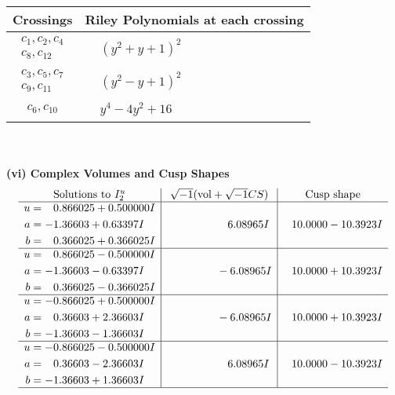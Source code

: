 \documentclass[1p]{elsarticle_modified}
\theoremstyle{definition}
\newcommand{\I}{\sqrt{-1}}
\begin{document}
\begin{tabular}{m{50pt}|m{274pt}}
Crossings & \hspace{64pt}Riley Polynomials at each crossing \\
\hline $$\begin{aligned}c_{1},c_{2},c_{4}\\c_{8},c_{12}\end{aligned}$$&$\begin{aligned}
&(y^2+y+1)^2
\end{aligned}$\\
\hline $$\begin{aligned}c_{3},c_{5},c_{7}\\c_{9},c_{11}\end{aligned}$$&$\begin{aligned}
&(y^2- y+1)^2
\end{aligned}$\\
\hline $$\begin{aligned}c_{6},c_{10}\end{aligned}$$&$\begin{aligned}
&y^4-4 y^2+16
\end{aligned}$\\
\hline
\end{tabular}\\~\\
\newpage\flushleft \textbf{(vi) Complex Volumes and Cusp Shapes}
$$\begin{array}{c|c|c}  
\text{Solutions to }I^u_{2}& \I (\text{vol} + \sqrt{-1}CS) & \text{Cusp shape}\\
 \hline 
\begin{aligned}
u &= \phantom{-}0.866025 + 0.500000 I \\
a &= -1.36603 + 0.63397 I \\
b &= \phantom{-}0.366025 + 0.366025 I\end{aligned}
 & \phantom{-0.000000 -}6.08965 I & \phantom{-}10.0000 - 10.3923 I \\ \hline\begin{aligned}
u &= \phantom{-}0.866025 - 0.500000 I \\
a &= -1.36603 - 0.63397 I \\
b &= \phantom{-}0.366025 - 0.366025 I\end{aligned}
 & \phantom{-0.000000 } -6.08965 I & \phantom{-}10.0000 + 10.3923 I \\ \hline\begin{aligned}
u &= -0.866025 + 0.500000 I \\
a &= \phantom{-}0.36603 + 2.36603 I \\
b &= -1.36603 - 1.36603 I\end{aligned}
 & \phantom{-0.000000 } -6.08965 I & \phantom{-}10.0000 + 10.3923 I \\ \hline\begin{aligned}
u &= -0.866025 - 0.500000 I \\
a &= \phantom{-}0.36603 - 2.36603 I \\
b &= -1.36603 + 1.36603 I\end{aligned}
 & \phantom{-0.000000 -}6.08965 I & \phantom{-}10.0000 - 10.3923 I\\
 \hline 
 \end{array}$$\newpage\newpage\renewcommand{\arraystretch}{1}
\end{document}
